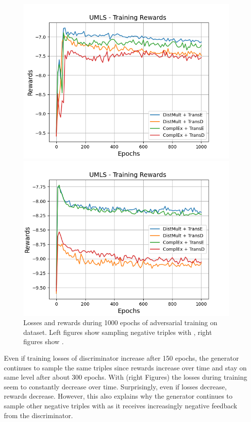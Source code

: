 \begin{figure}[H]
\begin{minipage}{.5\textwidth}
      \includegraphics[width=0.9\linewidth]{figures/results/gan_train/not_pretrained/uncertainty/max/entropy/umls/1k_epochs/uncertainty_umls_rew.png}
    \end{minipage}%
    \begin{minipage}{.5\textwidth}
      \centering
      \includegraphics[width=0.9\linewidth]{figures/results/gan_train/not_pretrained/uncertainty/max_distribution/entropy/umls/1k_epochs/uncertainty_umls_rew.png}
    \end{minipage}%
    \caption{Losses and rewards during 1000 epochs of adversarial training on \umls dataset. 
    Left figures show sampling negative triples with \usmax, right figures show \ussoftmax.}
    \label{fig:advtrain_umls_usmax_ussoftmax_losses_rewards}
\end{figure}
Even if training losses of discriminator increase after 150 epochs, the generator continues to sample the same triples since rewards increase over time and stay on same level after about 300 epochs.
With \ussoftmax (right Figures) the losses during training seem to constantly decrease over time.
Surprisingly, even if losses decrease, rewards decrease.
However, this also explains why the generator continues to sample other negative triples with \ussoftmax as it receives increasingly negative feedback from the discriminator.

